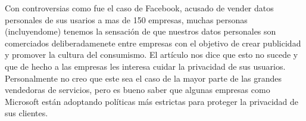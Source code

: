 \documentclass[12pt,a4paper]{article}
\begin{document}
\begin{enumerate}
\begin{enumerate}
        			Con controversias como fue el caso de Facebook, acusado de vender 
				datos personales de sus usarios a mas de 150 empresas, muchas personas (incluyendome) 
				tenemos la sensación de que nuestros datos personales son comerciados deliberadamenete 
				entre empresas con el objetivo de crear publicidad y promover la cultura del consumismo. 
				El artículo nos dice que esto no sucede y que de hecho a las empresas les interesa cuidar 
				la privacidad de sus usuarios. Personalmente no creo que este sea el caso de la mayor 
				parte de las grandes vendedoras de servicios, pero es bueno saber que algunas empresas 
				como Microsoft están adoptando políticas más estrictas para proteger la privacidad de 
				sus clientes.
				
		\end{enumerate}

\end{enumerate}
\end{document}
